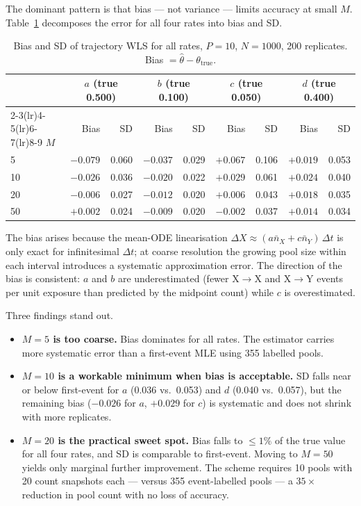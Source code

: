 \documentclass[12pt]{article}
\begin{document}
The dominant pattern is that bias — not variance — limits accuracy at small
$M$.  Table~\ref{tab:traj_bias} decomposes the error for all four rates
into bias and SD.

\begin{table}[H]
\centering
\caption{Bias and SD of trajectory WLS for all rates,
         $P=10$, $N=1000$, 200 replicates.
         Bias $= \hat\theta - \theta_{\mathrm{true}}$.}
\label{tab:traj_bias}
\begin{tabular}{lrrrrrrrr}
\toprule
 & \multicolumn{2}{c}{$a$ (true 0.500)} &
   \multicolumn{2}{c}{$b$ (true 0.100)} &
   \multicolumn{2}{c}{$c$ (true 0.050)} &
   \multicolumn{2}{c}{$d$ (true 0.400)} \\
\cmidrule(lr){2-3}\cmidrule(lr){4-5}\cmidrule(lr){6-7}\cmidrule(lr){8-9}
$M$ & Bias & SD & Bias & SD & Bias & SD & Bias & SD \\
\midrule
5  & $-0.079$ & 0.060 & $-0.037$ & 0.029 & $+0.067$ & 0.106 & $+0.019$ & 0.053 \\
10 & $-0.026$ & 0.036 & $-0.020$ & 0.022 & $+0.029$ & 0.061 & $+0.024$ & 0.040 \\
20 & $-0.006$ & 0.027 & $-0.012$ & 0.020 & $+0.006$ & 0.043 & $+0.018$ & 0.035 \\
50 & $+0.002$ & 0.024 & $-0.009$ & 0.020 & $-0.002$ & 0.037 & $+0.014$ & 0.034 \\
\bottomrule
\end{tabular}
\end{table}

The bias arises because the mean-ODE linearisation
$\Delta X \approx (a\bar{n}_X + c\bar{n}_Y)\,\Delta t$ is only exact for
infinitesimal $\Delta t$; at coarse resolution the growing pool size within
each interval introduces a systematic approximation error.  The direction of
the bias is consistent: $a$ and $b$ are underestimated (fewer X$\to$X and
X$\to$Y events per unit exposure than predicted by the midpoint count) while
$c$ is overestimated.

Three findings stand out.

\begin{itemize}
  \item \textbf{$M = 5$ is too coarse.}
        Bias dominates for all rates.
        The estimator carries more systematic error than a first-event MLE
        using 355 labelled pools.

  \item \textbf{$M = 10$ is a workable minimum when bias is acceptable.}
        SD falls near or below first-event for $a$ (0.036 vs.\ 0.053) and
        $d$ (0.040 vs.\ 0.057), but the remaining bias ($-0.026$ for $a$,
        $+0.029$ for $c$) is systematic and does not shrink with more
        replicates.

  \item \textbf{$M = 20$ is the practical sweet spot.}
        Bias falls to $\leq 1\%$ of the true value for all four rates,
        and SD is comparable to first-event.  Moving to $M = 50$ yields
        only marginal further improvement.  The scheme requires 10 pools
        with 20 count snapshots each — versus 355 event-labelled pools —
        a $35\times$ reduction in pool count with no loss of accuracy.
\end{itemize}
\end{document}
